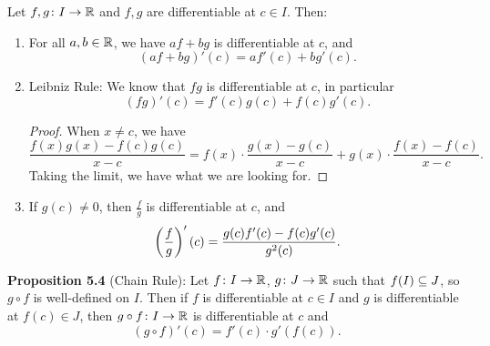 \documentclass[class=article, crop=false]{standalone}
\begin{document}
  \begin{theorem}{5.3}
    Let $f,g\colon I\to \mathbb{R}$ and $f, g$ are differentiable at $c\in I$. Then:
    \begin{enumerate}[label=(\roman*)]
      \item For all $a, b\in\mathbb{R}$, we have $af + bg$ is differentiable at $c$, and
      \[
        (af + bg)'(c) = af'(c) + bg'(c).
      \]
      \item Leibniz Rule: We know that $fg$ is differentiable at $c$, in particular
      \[
        (fg)'(c) = f'(c)g(c) + f(c)g'(c).
      \]
      \begin{proof}
        When $x\neq c$, we have
        \[
          \frac{f(x)g(x) - f(c)g(c)}{x - c} = f(x)\cdot \frac{g(x) - g(c)}{x - c} + g(x)\cdot \frac{f(x) - f(c)}{x - c}.
        \]
        Taking the limit, we have what we are looking for.
      \end{proof}
      \item If $g(c)\neq 0$, then $\frac{f}{g}$ is differentiable at $c$, and
      \[
        \left( \frac{f}{g} \right)'(c) = \frac{g(c)f'(c) - f(c)g'(c)}{g^2(c)}.
      \]
    \end{enumerate}
  \end{theorem}
  \textbf{Proposition 5.4} (Chain Rule): Let $f\colon I\to \mathbb{R}$, $g\colon J\to \mathbb{R}$ such that $f(I)\subseteq J$, so $g\circ f$ is well-defined on $I$. Then if $f$ is differentiable at $c\in I$ and $g$ is differentiable at $f(c)\in J$, then $g\circ f\colon I\to \mathbb{R}$ is differentiable at $c$ and
  \[
    (g\circ f)'(c) = f'(c)\cdot g'(f(c)).
  \]
\end{document}
